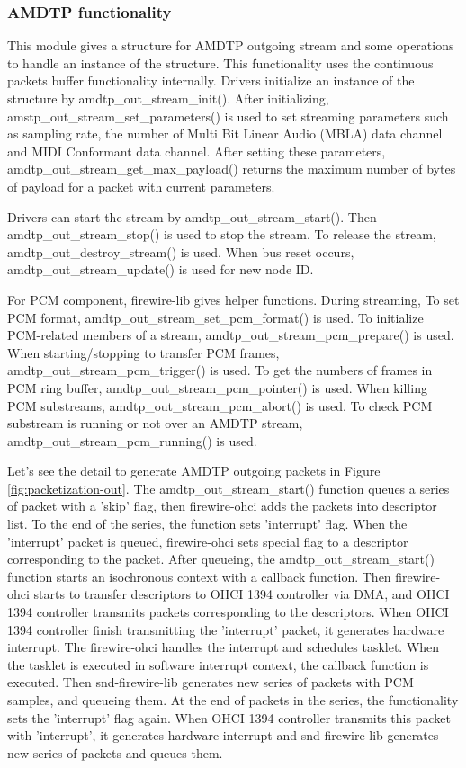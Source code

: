 \documentclass[onecolumn]{article}
\begin{document}
\subsubsection{AMDTP functionality}
\label{sec:enhancement-amdtp}

This module gives a structure for AMDTP outgoing stream and some operations to handle an instance of the structure. This functionality uses the continuous packets buffer functionality internally. Drivers initialize an instance of the structure by amdtp\_out\_stream\_init(). After initializing, amstp\_out\_stream\_set\_parameters() is used to set streaming parameters such as sampling rate, the number of Multi Bit Linear Audio (MBLA) data channel and MIDI Conformant data channel. After setting these parameters, amdtp\_out\_stream\_get\_max\_payload() returns the maximum number of bytes of payload for a packet with current parameters.

Drivers can start the stream by amdtp\_out\_stream\_start(). Then amdtp\_out\_stream\_stop() is used to stop the stream. To release the stream, amdtp\_out\_destroy\_stream() is used. When bus reset occurs, amdtp\_out\_stream\_update() is used for new node ID.

For PCM component, firewire-lib gives helper functions. During streaming, To set PCM format, amdtp\_out\_stream\_set\_pcm\_format() is used. To initialize PCM-related members of a stream, amdtp\_out\_stream\_pcm\_prepare() is used. When starting/stopping to transfer PCM frames, amdtp\_out\_stream\_pcm\_trigger() is used. To get the numbers of frames in PCM ring buffer, amdtp\_out\_stream\_pcm\_pointer() is used. When killing PCM substreams, amdtp\_out\_stream\_pcm\_abort() is used. To check PCM substream is running or not over an AMDTP stream, amdtp\_out\_stream\_pcm\_running() is used.

Let's see the detail to generate AMDTP outgoing packets in Figure \ref{fig:packetization-out}. The amdtp\_out\_stream\_start() function queues a series of packet with a 'skip' flag, then firewire-ohci adds the packets into descriptor list. To the end of the series, the function sets 'interrupt' flag. When the 'interrupt' packet is queued, firewire-ohci sets special flag to a descriptor corresponding to the packet. After queueing, the amdtp\_out\_stream\_start() function starts an isochronous context with a callback function. Then firewire-ohci starts to transfer descriptors to OHCI 1394 controller via DMA, and OHCI 1394 controller transmits packets corresponding to the descriptors. When OHCI 1394 controller finish transmitting the 'interrupt' packet, it generates hardware interrupt. The firewire-ohci handles the interrupt and schedules tasklet. When the tasklet is executed in software interrupt context, the callback function is executed. Then snd-firewire-lib generates new series of packets with PCM samples, and queueing them. At the end of packets in the series, the functionality sets the 'interrupt' flag again. When OHCI 1394 controller transmits this packet with 'interrupt', it generates hardware interrupt and snd-firewire-lib generates new series of packets and queues them.
\end{document}
